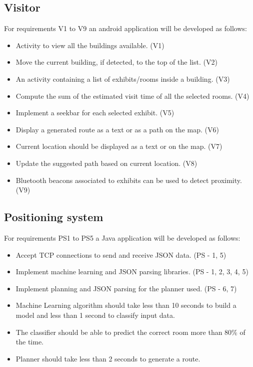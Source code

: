 \subsection{Visitor}
For requirements V1 to V9 an android application will be developed as follows:
	\begin{itemize}
		\item Activity to view all the buildings available. (V1)
		\item Move the current building, if detected, to the top of the list. (V2)
		\item An activity containing a list of exhibits/rooms inside a building. (V3)
		\item Compute the sum of the estimated visit time of all the selected rooms. (V4)
		\item Implement a seekbar for each selected exhibit. (V5)
		\item Display a generated route as a text or as a path on the map. (V6)
		\item Current location should be displayed as a text or on the map. (V7)
		\item Update the suggested path based on current location. (V8)
		\item Bluetooth beacons associated to exhibits can be used to detect proximity. (V9)
	\end{itemize}

\subsection{Positioning system}
For requirements PS1 to PS5 a Java application will be developed as follows:
	\begin{itemize}
		\item Accept TCP connections to send and receive JSON data. (PS - 1, 5)
		\item Implement machine learning and JSON parsing libraries. (PS - 1, 2, 3, 4, 5)
		\item Implement planning and JSON parsing for the planner used. (PS - 6, 7)
		\item Machine Learning algorithm should take less than 10 seconds to build a model and less than 1 second to classify input data.
		\item The classifier should be able to predict the correct room more than 80\% of the time.
		\item Planner should take less than 2 seconds to generate a route.
	\end{itemize}

